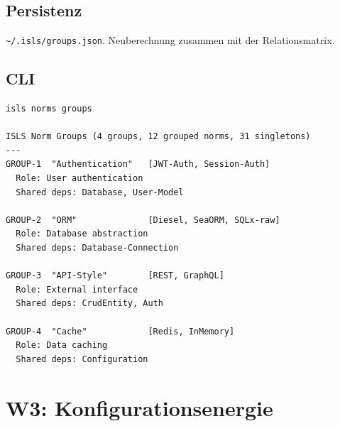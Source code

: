\documentclass[11pt,a4paper]{article}
\begin{document}
\subsection{Persistenz}

\texttt{\textasciitilde/.isls/groups.json}. Neuberechnung zusammen mit der Relationsmatrix.

\subsection{CLI}

\begin{lstlisting}[style=bash]
isls norms groups

ISLS Norm Groups (4 groups, 12 grouped norms, 31 singletons)
---
GROUP-1  "Authentication"   [JWT-Auth, Session-Auth]
  Role: User authentication
  Shared deps: Database, User-Model
  
GROUP-2  "ORM"              [Diesel, SeaORM, SQLx-raw]
  Role: Database abstraction
  Shared deps: Database-Connection
  
GROUP-3  "API-Style"        [REST, GraphQL]
  Role: External interface
  Shared deps: CrudEntity, Auth
  
GROUP-4  "Cache"            [Redis, InMemory]
  Role: Data caching
  Shared deps: Configuration
\end{lstlisting}

\section{W3: Konfigurationsenergie}
\label{sec:w3}
\end{document}
